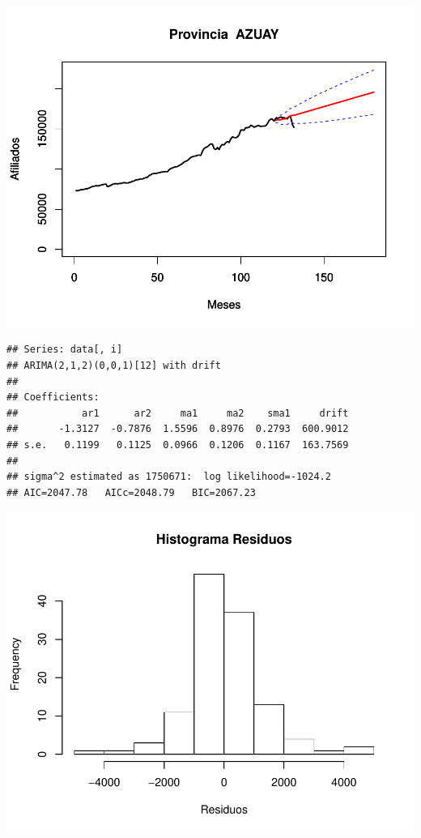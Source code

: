 \documentclass[11pt,a4paper,oneside]{article}\usepackage[]{graphicx}\usepackage[]{color}
\makeatletter
\def\maxwidth{ %
  \ifdim\Gin@nat@width>\linewidth
    \linewidth
  \else
    \Gin@nat@width
  \fi
}
\newenvironment{kframe}{%
 \def\at@end@of@kframe{}%
 \ifinner\ifhmode%
  \def\at@end@of@kframe{\end{minipage}}%
  \begin{minipage}{\columnwidth}%
 \fi\fi%
 \def\FrameCommand##1{\hskip\@totalleftmargin \hskip-\fboxsep
 \colorbox{shadecolor}{##1}\hskip-\fboxsep
     \hskip-\linewidth \hskip-\@totalleftmargin \hskip\columnwidth}%
 \MakeFramed {\advance\hsize-\width
   \@totalleftmargin\z@ \linewidth\hsize
   \@setminipage}}%
 {\par\unskip\endMakeFramed%
 \at@end@of@kframe}
\newenvironment{knitrout}{}{} %
\makeatother
\begin{document}
\begin{knitrout}
\color{fgcolor}

{\centering \includegraphics[width=\maxwidth]{figure/unnamed-chunk-16-1} 

}


\begin{kframe}\begin{verbatim}
## Series: data[, i] 
## ARIMA(2,1,2)(0,0,1)[12] with drift         
## 
## Coefficients:
##           ar1      ar2     ma1     ma2    sma1     drift
##       -1.3127  -0.7876  1.5596  0.8976  0.2793  600.9012
## s.e.   0.1199   0.1125  0.0966  0.1206  0.1167  163.7569
## 
## sigma^2 estimated as 1750671:  log likelihood=-1024.2
## AIC=2047.78   AICc=2048.79   BIC=2067.23
\end{verbatim}
\end{kframe}

{\centering \includegraphics[width=\maxwidth]{figure/unnamed-chunk-16-2} 

}
\end{knitrout}
\end{document}
